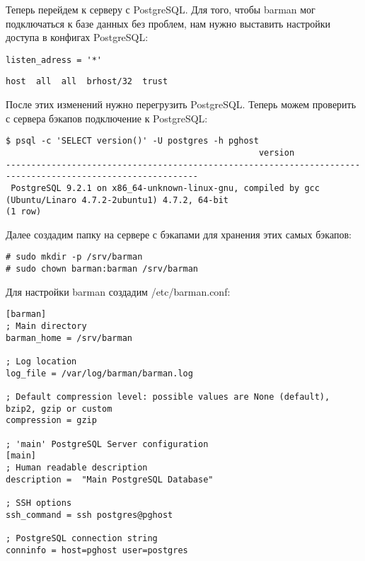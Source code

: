 Теперь перейдем к серверу с PostgreSQL. Для того, чтобы barman мог подключаться к базе данных без проблем, нам нужно выставить настройки доступа в конфигах PostgreSQL:

\begin{lstlisting}[label=lst:barman4,caption=Отредактировать в postgresql.conf]
listen_adress = '*'
\end{lstlisting}

\begin{lstlisting}[label=lst:barman5,caption=Добавить в pg\_hba.conf]
host  all  all  brhost/32  trust
\end{lstlisting}

После этих изменений нужно перегрузить PostgreSQL. Теперь можем проверить с сервера бэкапов подключение к PostgreSQL:

\begin{lstlisting}[label=lst:barman6,caption=Проверка подключения к базе]
$ psql -c 'SELECT version()' -U postgres -h pghost
                                                  version                                                   
------------------------------------------------------------------------------------------------------------
 PostgreSQL 9.2.1 on x86_64-unknown-linux-gnu, compiled by gcc (Ubuntu/Linaro 4.7.2-2ubuntu1) 4.7.2, 64-bit
(1 row)
\end{lstlisting}

Далее создадим папку на сервере с бэкапами для хранения этих самых бэкапов:

\begin{lstlisting}[label=lst:barman7,caption=Папка для хранения бэкапов]
# sudo mkdir -p /srv/barman    
# sudo chown barman:barman /srv/barman
\end{lstlisting}

Для настройки barman создадим /etc/barman.conf:

\begin{lstlisting}[label=lst:barman8,caption=barman.conf]
[barman]
; Main directory
barman_home = /srv/barman

; Log location
log_file = /var/log/barman/barman.log

; Default compression level: possible values are None (default), bzip2, gzip or custom
compression = gzip

; 'main' PostgreSQL Server configuration
[main]
; Human readable description
description =  "Main PostgreSQL Database"

; SSH options
ssh_command = ssh postgres@pghost

; PostgreSQL connection string
conninfo = host=pghost user=postgres
\end{lstlisting}

